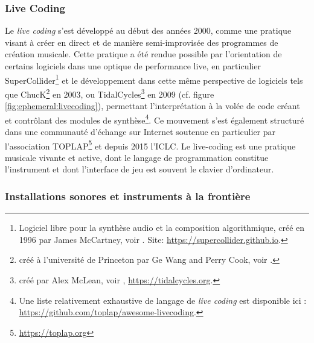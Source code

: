 \subsubsection{Live Coding}

\noindent Le \textit{live coding} s'est développé au début des années 2000, comme une pratique visant à créer en direct et de manière semi-improvisée des programmes de création musicale. Cette pratique a été rendue possible par l'orientation de certains logiciels dans une optique de performance live, en particulier SuperCollider\footnote{Logiciel libre pour la synthèse audio et la composition algorithmique, créé en 1996 par James McCartney, voir \cite{mccartney_rethinking_2002}. Site: \url{https://supercollider.github.io}.} et le développement dans cette même perspective de logiciels tels que ChucK\footnote{créé à l'université de Princeton par Ge Wang and Perry Cook, voir \cite{wang_chuck_2003}.} en 2003, ou TidalCycles\footnote{créé par Alex McLean, voir \cite{mclean_tidalpattern_2010}, \url{https://tidalcycles.org}.} en 2009 (cf. figure \ref{fig:ephemeral:livecoding}), permettant l'interprétation à la volée de code créant et contrôlant des modules de synthèse\footnote{Une liste relativement exhaustive de langage de \textit{live coding} est disponible ici : \url{https://github.com/toplap/awesome-livecoding}.}. Ce mouvement s'est également structuré dans une communauté d'échange sur Internet soutenue en particulier par l'association TOPLAP\footnote{\url{https://toplap.org}} et depuis 2015 l'\gls{ICLC}. Le live-coding est une pratique musicale vivante et active, dont le langage de programmation constitue l'instrument \cite{blackwell_programming_2005} et dont l'interface de jeu est souvent le clavier d'ordinateur.\\


\subsubsection{Installations sonores et instruments à la frontière}


